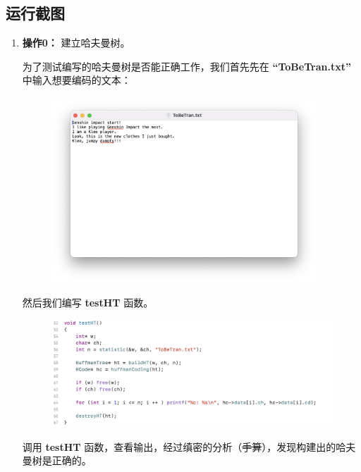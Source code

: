     \subsection{运行截图}
        \begin{enumerate}
            \item \textbf{操作0：} 建立哈夫曼树。
                \par 为了测试编写的哈夫曼树是否能正确工作，我们首先先在 \textbf{``ToBeTran.txt''} 中输入想要编码的文本：
                \begin{figure}[htbp]
                    \centering
                    \includegraphics*[width = 10cm]{s3_0.png}
                \end{figure}
                \par 然后我们编写 \textbf{testHT} 函数。
                \begin{figure}[htbp]
                    \hspace*{1.2cm}
                    \includegraphics*[width = 12cm]{s3_1.png}
                \end{figure}
                \par 调用 \textbf{testHT} 函数，查看输出，经过缜密的分析（\sout{手算}），发现构建出的哈夫曼树是正确的。
                \begin{figure}[h]
                    \hspace*{1.2cm}

\end{figure}
\end{enumerate}
